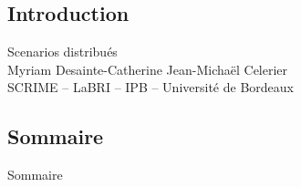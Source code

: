 \subsection*{Introduction}
\begin{frame}
	\vspace{0.5cm}
	\begin{center}
		{\LARGE Scenarios distribués}\\[0.5cm]
		{\large Myriam Desainte-Catherine \hfill Jean-Michaël Celerier}\\
		\vfill
		SCRIME -- LaBRI -- IPB -- Université de Bordeaux
	\end{center}
\end{frame}

\subsection*{Sommaire}
\begin{frame}{Sommaire}
	\setlength{\columnsep}{2cm}
	\setlength{\columnseprule}{1pt}
	\begin{multicols}{2}
		\tableofcontents
	\end{multicols}
\end{frame}